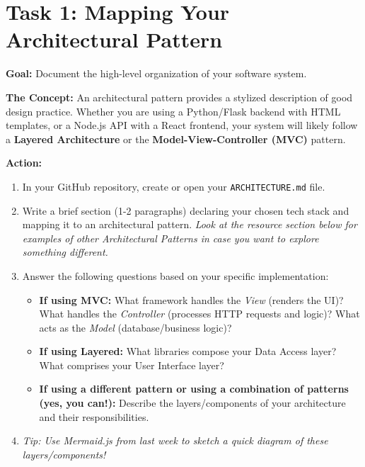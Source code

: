 \documentclass[a4paper,12pt]{article}
\begin{document}

\section*{Task 1: Mapping Your Architectural Pattern}

\textbf{Goal:} Document the high-level organization of your software system.

\textbf{The Concept:} An architectural pattern provides a stylized description of good design practice. Whether you are using a Python/Flask backend with HTML templates, or a Node.js API with a React frontend, your system will likely follow a \textbf{Layered Architecture} or the \textbf{Model-View-Controller (MVC)} pattern.

\vspace{0.3cm}
\textbf{Action:}
\begin{enumerate}
    \item In your GitHub repository, create or open your \texttt{ARCHITECTURE.md} file.
    \item Write a brief section (1-2 paragraphs) declaring your chosen tech stack and mapping it to an architectural pattern.    \textit{Look at the resource section below for examples of other Architectural Patterns in case you want to explore something different.}
    \item Answer the following questions based on your specific implementation:
    \begin{itemize}
        \item \textbf{If using MVC:} What framework handles the \textit{View} (renders the UI)? What handles the \textit{Controller} (processes HTTP requests and logic)? What acts as the \textit{Model} (database/business logic)?
        \item \textbf{If using Layered:} What libraries compose your Data Access layer? What comprises your User Interface layer?
        \item \textbf{If using a different pattern or using a combination of patterns (yes, you can!):} Describe the layers/components of your architecture and their responsibilities.
    \end{itemize}
    \item \textit{Tip: Use Mermaid.js from last week to sketch a quick diagram of these layers/components!}
\end{enumerate}
    
\end{document}
